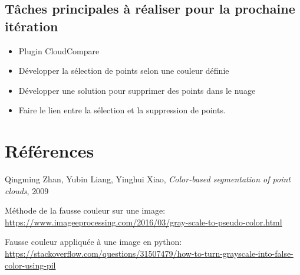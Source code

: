 \documentclass[12pt,titlepage,french]{article}
\newcounter{firstbib}
\begin{document}
\subsection{Tâches principales à réaliser pour la prochaine itération}
\begin{itemize}
  \item Plugin CloudCompare
  \item Développer la sélection de points selon une couleur définie
  \item Développer une solution pour supprimer des points dans le nuage
  \item Faire le lien entre la sélection et la suppression de points.
\end{itemize}

\newpage

\section {Références}


\renewcommand{\refname}{Segmentation}
\begin{thebibliography}{3}
 Qingming Zhan, Yubin Liang, Yinghui Xiao, \textit{Color-based segmentation of point clouds}, 2009

\setcounter{firstbib}{\value{enumiv}}
\end{thebibliography}

\renewcommand{\refname}{Fausse couleur}
\begin{thebibliography}{3}
\setcounter{enumiv}{\value{firstbib}}


 Méthode de la fausse couleur sur une image:
\url{https://www.imageeprocessing.com/2016/03/gray-scale-to-pseudo-color.html}

 Fausse couleur appliquée à une image en python:
\url{https://stackoverflow.com/questions/31507479/how-to-turn-grayscale-into-false-color-using-pil}

\setcounter{firstbib}{\value{enumiv}}
\end{thebibliography}
\end{document}
